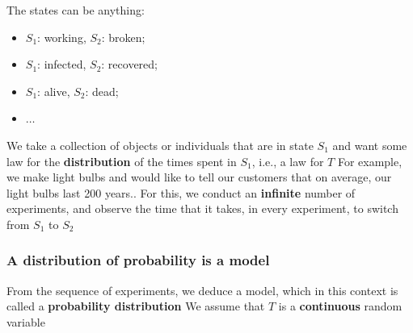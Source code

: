 \documentclass[aspectratio=169]{beamer}\usepackage[]{graphicx}\usepackage[]{xcolor}
\begin{document}
\begin{frame}
The states can be anything:
\begin{itemize}
\item $S_1$: working, $S_2$: broken;
\item $S_1$: infected, $S_2$: recovered;
\item $S_1$: alive, $S_2$: dead;
\item $\ldots$
\end{itemize}
\vfill
We take a collection of objects or individuals that are in state $S_1$ and want
some law for the \textbf{distribution} of the times spent in $S_1$, i.e., a law for $T$
\vfill
For example, we make light bulbs and would like to tell our customers that on
average, our light bulbs last 200 years..
\vfill
For this, we conduct an \textbf{infinite} number of experiments, and observe the
time that it takes, in every experiment, to switch from $S_1$ to $S_2$
\end{frame}


\begin{frame}\frametitle{A distribution of probability is a model}
From the sequence of experiments, we deduce a model, which in this context is called a \textbf{probability distribution}
\vfill
We assume that $T$ is a \textbf{continuous} random variable
\end{frame}
\end{document}
